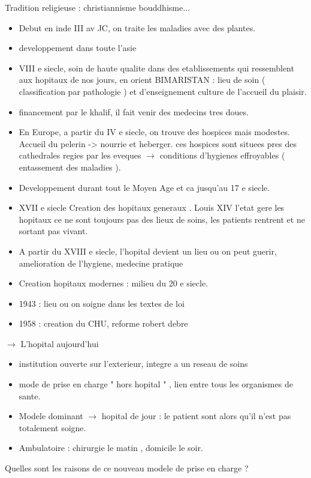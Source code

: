 \documentclass{article}
\begin{document}
Tradition religieuse : christiannisme bouddhisme...
\begin{itemize}[label=\textbullet]
	\item Debut en inde III av JC, on traite les maladies avec des plantes.
	\item developpement dans toute l'asie
	\item VIII e siecle, soin de haute qualite dans des etablissements qui ressemblent aux hopitaux de nos jours, en orient BIMARISTAN : lieu de soin ( classification par pathologie ) et d'enseignement culture de l'accueil du plaisir.
	\item financement par le khalif, il fait venir des medecins tres doues.
	\item En Europe, a partir du IV e siecle, on trouve des hospices mais modestes. Accueil du pelerin -> nourrie et heberger. ces hospices sont situees pres des cathedrales regies par les eveques $\rightarrow $ conditions d'hygienes effroyables ( entassement des maladies ).
	\item Developpement durant tout le Moyen Age et ca jusqu'au 17 e siecle.
	\item XVII e siecle Creation des hopitaux generaux . Louis XIV l'etat gere les hopitaux ce ne sont toujours pas des lieux de soins, les patients rentrent et ne sortant pas vivant.
	\item A partir du XVIII e siecle, l'hopital devient un lieu ou on peut guerir, amelioration de l'hygiene, medecine pratique
	\item Creation hopitaux modernes : milieu du 20 e siecle.
	\item 1943 : lieu ou on soigne dans les textes de loi
	\item 1958 : creation du CHU, reforme robert debre
\end{itemize}
$\rightarrow$ L'hopital aujourd'hui
\begin{itemize}[label=\textbullet]
	\item institution ouverte sur l'exterieur, integre a un reseau de soins
	\item mode de prise en charge " hors hopital " , lien entre tous les organismes de sante.
	\item Modele dominant $\rightarrow$ hopital de jour : le patient sont alors qu'il n'est pas totalement soigne.
	\item Ambulatoire : chirurgie le matin , domicile le soir.
\end{itemize}

Quelles sont les raisons de ce nouveau modele de prise en charge ? 
\end{document}
